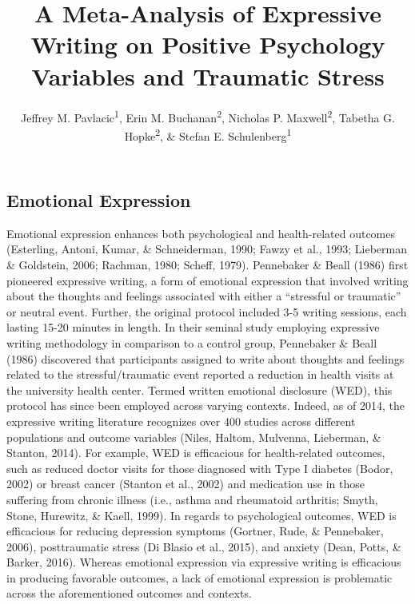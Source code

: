 \documentclass[man, mask]{apa6}
\title{A Meta-Analysis of Expressive Writing on Positive Psychology Variables
and Traumatic Stress}
\author{Jeffrey M. Pavlacic\textsuperscript{1}, Erin M. Buchanan\textsuperscript{2}, Nicholas P. Maxwell\textsuperscript{2}, Tabetha G. Hopke\textsuperscript{2}, \& Stefan E. Schulenberg\textsuperscript{1}}
\affiliation{
    \vspace{0.5cm}
          \textsuperscript{1} University of Mississippi\\
          \textsuperscript{2} Missouri State University  }
\theoremstyle{definition}
\theoremstyle{definition}
\theoremstyle{definition}
\theoremstyle{remark}
\begin{document}
\maketitle

\setcounter{secnumdepth}{0}



\subsection{Emotional Expression}\label{emotional-expression}

Emotional expression enhances both psychological and health-related
outcomes (Esterling, Antoni, Kumar, \& Schneiderman, 1990; Fawzy et al.,
1993; Lieberman \& Goldstein, 2006; Rachman, 1980; Scheff, 1979).
Pennebaker \& Beall (1986) first pioneered expressive writing, a form of
emotional expression that involved writing about the thoughts and
feelings associated with either a \enquote{stressful or traumatic} or
neutral event. Further, the original protocol included 3-5 writing
sessions, each lasting 15-20 minutes in length. In their seminal study
employing expressive writing methodology in comparison to a control
group, Pennebaker \& Beall (1986) discovered that participants assigned
to write about thoughts and feelings related to the stressful/traumatic
event reported a reduction in health visits at the university health
center. Termed written emotional disclosure (WED), this protocol has
since been employed across varying contexts. Indeed, as of 2014, the
expressive writing literature recognizes over 400 studies across
different populations and outcome variables (Niles, Haltom, Mulvenna,
Lieberman, \& Stanton, 2014). For example, WED is efficacious for
health-related outcomes, such as reduced doctor visits for those
diagnosed with Type I diabetes (Bodor, 2002) or breast cancer (Stanton
et al., 2002) and medication use in those suffering from chronic illness
(i.e., asthma and rheumatoid arthritis; Smyth, Stone, Hurewitz, \&
Kaell, 1999). In regards to psychological outcomes, WED is efficacious
for reducing depression symptoms (Gortner, Rude, \& Pennebaker, 2006),
posttraumatic stress (Di Blasio et al., 2015), and anxiety (Dean, Potts,
\& Barker, 2016). Whereas emotional expression via expressive writing is
efficacious in producing favorable outcomes, a lack of emotional
expression is problematic across the aforementioned outcomes and
contexts.
\end{document}
